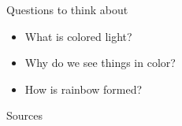\begin{frame}{Questions to think about}
  \begin{itemize}
    \item What is colored light?
    \item Why do we see things in color?
    \item How is rainbow formed?
  \end{itemize}
\end{frame}
\begin{frame}{Sources}
\nocite{bbc2006light}
\nocite{wilk2008eye}

\end{frame}


